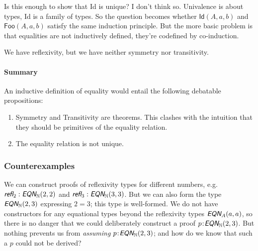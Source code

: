 \documentclass{article}
\begin{document}

Is this enough to show that \textsf{Id} is unique? I don't think so.
Univalence is about types, \textsf{Id} is a family of types. So the
question becomes whether \(\textsf{Id}(A,a,b)\) and
\(\textsf{Foo}(A,a,b)\) satisfy the same induction principle. But the
more basic problem is that equalities are not inductively defined,
they're codefined by co-induction.

 We have reflexivity, but we have
neither symmetry nor transitivity.

\paragraph{Summary}
An inductive definition of equality would entail the following
debatable propositions:


\begin{enumerate}
\item Symmetry and Transitivity are theorems. This clashes with the
  intuition that they should be primitives of the equality relation.
\item The equality relation is not unique.
\end{enumerate}

\subsubsection{Counterexamples}

We can construct proofs of reflexivity types for different numbers,
e.g. \(\refl_2:\EQN_{\Nat}(2,2)\) and \(\refl_3:\EQN_{\Nat}(3,3)\).
But we can also form the type \(\EQN_{\Nat}(2,3)\) expressing \(2=3\);
this type is well-formed. We do not have constructors for any
equational types beyond the reflexivity types \(\EQN_A(a,a)\), so
there is no danger that we could deliberately construct a proof
\(\tj{p}{\EQN_{\Nat}(2,3)}\). But nothing prevents us from
\textit{assuming} \(\tj{p}{\EQN_{\Nat}(2,3)}\); and how do we know
that such a \(p\) could not be derived?

\end{document}
